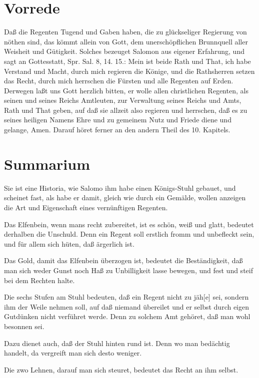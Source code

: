 \section{Vorrede}

Daß die Regenten Tugend und Gaben haben, die zu glückseliger Regierung von nöthen sind, das kömmt allein von Gott, dem unerschöpflichen Brunnquell aller Weisheit und Gütigkeit. Solches bezeuget Salomon aus eigener Erfahrung, und sagt an Gottesstatt, Spr. Sal. 8, 14. 15.: Mein ist beide Rath und That, ich habe Verstand und Macht, durch mich regieren die Könige, und die Rathsherren setzen das Recht, durch mich herrschen die Fürsten und alle Regenten auf Erden. Derwegen laßt uns Gott herzlich bitten, er wolle allen christlichen Regenten, als seinen und seines Reichs Amtleuten, zur Verwaltung seines Reichs und Amts, Rath und That geben, auf daß sie allzeit also regieren und herrschen, daß es zu seines heiligen Namens Ehre und zu gemeinem Nutz und Friede diene und gelange, Amen. Darauf höret ferner an den andern Theil des 10. Kapitels.

\section{Summarium}

Sie ist eine Historia, wie Salomo ihm habe einen Königs-Stuhl gebauet, und scheinet fast, als habe er damit, gleich wie durch ein Gemälde, wollen anzeigen die Art und Eigenschaft eines vernünftigen Regenten.

Das Elfenbein, wenn mans recht zubereitet, ist es schön, weiß und glatt, bedeutet derhalben die Unschuld. Denn ein Regent soll erstlich fromm und unbefleckt sein, und für allem sich hüten, daß ärgerlich ist.

Das Gold, damit das Elfenbein überzogen ist, bedeutet die Beständigkeit, daß man sich weder Gunst noch Haß zu Unbilligkeit lasse bewegen, und fest und steif bei dem Rechten halte.

Die sechs Stufen am Stuhl bedeuten, daß ein Regent nicht zu jäh[e] sei, sondern ihm der Weile nehmen soll, auf daß niemand übereilet und er selbst durch eigen Gutdünken nicht verführet werde. Denn zu solchem Amt gehöret, daß man wohl besonnen sei.

Dazu dienet auch, daß der Stuhl hinten rund ist. Denn wo man bedächtig handelt, da vergreift man sich desto weniger.

Die zwo Lehnen, darauf man sich steuret, bedeutet das Recht an ihm selbst.

